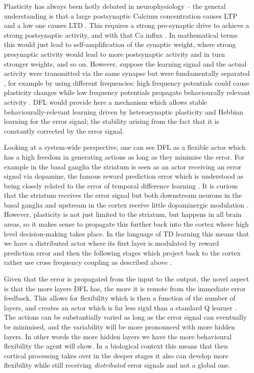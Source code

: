 \documentclass{article}
\begin{document}
Plasticity has always been hotly debated in neurophysiology -- the
general understanding is that a large postsynaptic Calcium
concentration causes LTP \cite{Malenka99,Bennett2000} and a low one
causes LTD \cite{Mulkey1992}. This requires a strong pre-synaptic
drive to achieve a strong postsynaptic activity, and with that Ca
influx \cite{Meunier2017}. In mathematical terms this would just lead
to self-amplification of the synaptic weight, where strong presynaptic
activity would lead to more postsynaptic activity and in turn stronger
weights, and so on. However, suppose the learning signal and the
actual activity were transmitted via the same synapse but were
fundamentally separated \cite{Lindsay2017}, for example by using
different frequencies: high frequency potentials could cause
plasticity changes while low frequency potentials propagate
behaviourally relevant activity \cite{Canolty2010}. DFL would provide
here a mechanism which allows stable behaviourally-relevant learning
driven by heterosynaptic plasticity and Hebbian learning for the error
signal; the stability arising from the fact that it is constantly
corrected by the error signal.

Looking at a system-wide perspective, one can see DFL as a flexible
actor which has a high freedom in generating actions as long as they
minimise the error. For example in the basal ganglia the striatum is
seen as an actor receiving an error signal via dopamine, the famous
reward prediction error \cite{Schultz97} which is understood as being
closely related to the error of temporal difference learning
\cite{gurney98:_basal_gangl_action_selec_devic}. It is curious that
the striatum receives the error signal but both downstream neurons in
the basal ganglia and upstream in the cortex receive little
dopaminergic modulation \cite{Beckstead1979}. However, plasticity is
not just limited to the striatum, but happens in all brain areas, so
it makes sense to propagate this further back into the cortex
\cite{Groenewegen1993} where high level decision-making takes place.
In the language of TD learning \cite{Sutton87} this means that we
have a distributed actor where its first layer is modulated by
reward prediction error and then the following stages which project
back to the cortex rather use cross frequency coupling
as described above \cite{Lipski2017}.

Given that the error is propagated from the input to the
output, the novel aspect is that the more layers DFL has, the more it
is remote from the immediate error feedback. This allows for
flexibility which is then a function of the number of layers, and
creates an actor which is far less rigid than a standard Q learner
\cite{Dayan1992}. The actions can be substantially varied as
long as the error signal can eventually be minimised, and the variability will be
more pronounced with more hidden layers. In other words the more
hidden layers we have the more behavioural flexibility the agent will
show. In a biological context this means that then cortical processing
takes over in the deeper stages it also can develop more flexibility
while still receiving \textsl{distributed} error signals and not
a global one.
\end{document}
